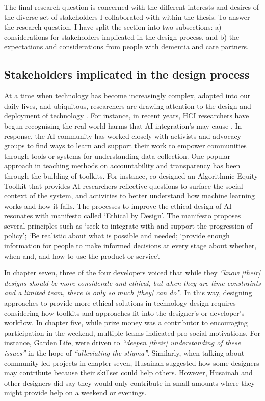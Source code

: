 The final research question is concerned with the different interests and desires of the diverse set of stakeholders I collaborated with within the thesis. To answer the research question, I have split the section into two subsections: a) considerations for stakeholders implicated in the design process, and b) the expectations and considerations from people with dementia and care partners.

\subsection{Stakeholders implicated in the design process}
\label{DevsDesigners}
At a time when technology has become increasingly complex, adopted into our daily lives, and ubiquitous, researchers are drawing attention to the design and deployment of technology \citep{west_data_2019}. For instance, in recent years, HCI researchers have begun recognising the real-world harms that AI integration's may cause \citep{borenstein2021emerging}. In response, the AI community has worked closely with activists and advocacy groups to find ways to learn and support their work to empower communities through tools or systems for understanding data collection. One popular approach in teaching methods on accountability and transparency has been through the building of toolkits. For instance, \cite{krafft2021action} co-designed an Algorithmic Equity Toolkit that provides AI researchers reflective questions to surface the social context of the system, and activities to better understand how machine learning works and how it fails. The processes to improve the ethical design of AI resonates with \cite{mulvenna_ethical_2017} manifesto called `Ethical by Design'. The manifesto proposes several principles such as `seek to integrate with and support the progression of policy'; `Be realistic about what is possible and needed; `provide enough information for people to make informed decisions at every stage about whether, when and, and how to use the product or service'. 

In chapter seven, three of the four developers voiced that while they \textit{``know [their] designs should be more considerate and ethical,   but when they are time constraints and a limited team, there is only so much [they] can do''}. In this way, designing approaches to provide more ethical solutions in technology design requires considering how toolkits and approaches fit into the designer's or developer's workflow. In chapter five, while prize money was a contributor to encouraging participation in the weekend, multiple teams indicated pro-social motivations. For instance, Garden Life, were driven to \textit{``deepen [their] understanding of these issues''} in the hope of \textit{``alleviating the stigma'}'. Similarly, when talking about community-led projects in chapter seven, Husainah suggested how some designers may contribute because their skillset could help others. However, Husainah and other designers did say they would only contribute in small amounts where they might provide help on a weekend or evenings. 

